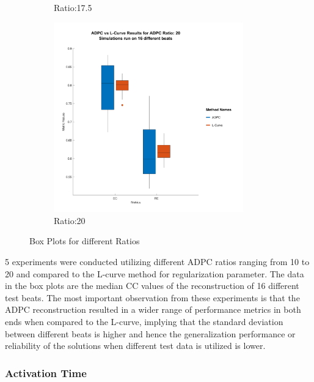 \documentclass[draftcls, onecolumn, journal]{IEEEtran}
\begin{document}
\begin{figure}[h]
\begin{subfigure}[b]{0.32\linewidth}
        \caption{Ratio:17.5}\label{subfig:d}
        \end{subfigure}
        \begin{subfigure}[b]{0.32\linewidth}
            \centering
            \includegraphics[width=0.9\textwidth]{../images/ADPC_vs_L-Curve_Results_for_ADPC_Ratio_20.png}
            \caption{Ratio:20}\label{subfig:e}
            \end{subfigure}
    \caption{Box Plots for different Ratios}
    \label{fig:diff_ratio}
\end{figure}

5 experiments were conducted utilizing different ADPC ratios ranging from 10 to 20 and compared to the L-curve method for regularization parameter. The data in the box plots are the median CC values of the reconstruction of 16 different test beats. The most important observation from these experiments is that the ADPC reconstruction resulted in a wider range of performance metrics in both ends when compared to the L-curve, implying that the standard deviation between different beats is higher and hence the generalization performance or reliability of the solutions when different test data is utilized is lower.

\newpage 

\subsubsection{Activation Time}
\end{document}
